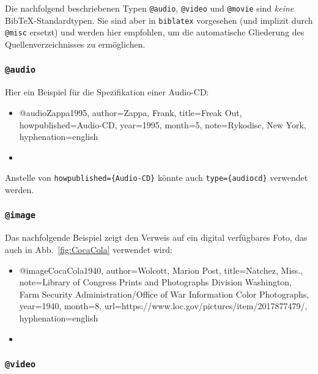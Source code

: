 Die nachfolgend beschriebenen Typen \texttt{@audio}, \texttt{@video} und \texttt{@movie} 
sind \emph{keine} Bib\-TeX-Standardtypen. Sie sind aber in \texttt{biblatex} vorgesehen
(und implizit durch \texttt{@misc} ersetzt) und werden hier empfohlen, um die automatische 
Gliederung des Quellenverzeichnisses zu ermöglichen.


\subsubsection{\texttt{@audio}}
\label{sec:@audio}
Hier ein Beispiel für die Spezifikation einer Audio-CD:
%
\begin{itemize}
\item[] 
\begin{GenericCode}[numbers=none]
@audio{Zappa1995,
  author={Zappa, Frank},
  title={Freak Out},
  howpublished={Audio-CD},
  year={1995},
  month={5},
  note={Rykodisc, New York},
  hyphenation={english}
}
\end{GenericCode}
\item[\cite{Zappa1995}] 
\end{itemize}
%
Anstelle von \verb!howpublished={Audio-CD}! könnte auch \verb!type={audiocd}! verwendet werden.


\subsubsection{\texttt{@image}}
\label{sec:@image}

Das nachfolgende Beispiel zeigt den Verweis auf ein digital verfügbares Foto,
das auch in Abb.\ \ref{fig:CocaCola} verwendet wird:
%
\begin{itemize}
\item[] 
\begin{GenericCode}[numbers=none]
@image{CocaCola1940,
  author={Wolcott, Marion Post},
	title={Natchez, Miss.},
	note={Library of Congress Prints and Photographs Division Washington, Farm Security Administration/Office of War Information Color Photographs},
	year={1940},
	month={8},
	url={https://www.loc.gov/pictures/item/2017877479/},
  hyphenation={english}
 }
\end{GenericCode}
\item[\cite{CocaCola1940}] 
\end{itemize}





\subsubsection{\texttt{@video}}
\label{sec:@video}

